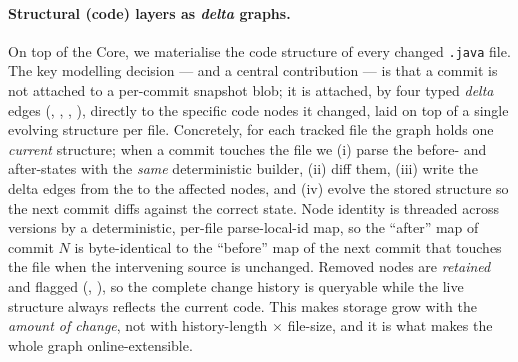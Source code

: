 	\paragraph{Structural (code) layers as \emph{delta} graphs.} On top of the Core, we
	materialise the code structure of every changed \texttt{.java} file. The key modelling
	decision --- and a central contribution --- is that a commit is not attached to a
	per-commit snapshot blob; it is attached, by four typed \emph{delta} edges
	(, , , ), directly to the specific
	code nodes it changed, laid on top of a single evolving structure per file. Concretely,
	for each tracked file the graph holds one \emph{current} structure; when a commit
	touches the file we (i) parse the before- and after-states with the \emph{same}
	deterministic builder, (ii) diff them, (iii) write the delta edges from the
	 to the affected nodes, and (iv) evolve the stored structure so the next
	commit diffs against the correct state. Node identity is threaded across versions by a
	deterministic, per-file parse-local-id map, so the ``after'' map of commit $N$ is
	byte-identical to the ``before'' map of the next commit that touches the file when the
	intervening source is unchanged. Removed nodes are \emph{retained} and flagged
	(, ), so the complete change history is queryable
	while the live structure always reflects the current code. This makes storage grow
	with the \emph{amount of change}, not with history-length $\times$ file-size, and it is
	what makes the whole graph online-extensible.
	
